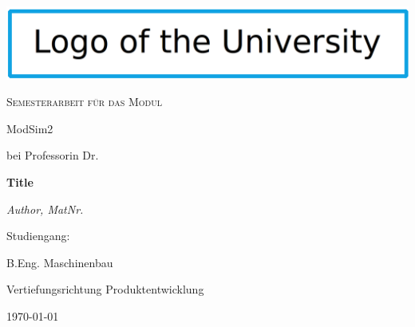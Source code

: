 \begin{titlepage} %
\centering
	\includegraphics[width=\textwidth]{graphics/university-logo}\par\vspace{1.5cm}
	\vspace{1.5cm}
	{\scshape\Large Semesterarbeit für das Modul\par
    ModSim2\par
    bei Professorin Dr.\par}
	\vspace{2cm}
	{\huge\bfseries Title\par}
	\vspace{2cm}
	{\Large\itshape Author, MatNr.\par}
	\vfill
	Studiengang:\par
	B.Eng. Maschinenbau\par
    Vertiefungsrichtung Produktentwicklung

	\vfill

	{\large \today\par}
\end{titlepage}